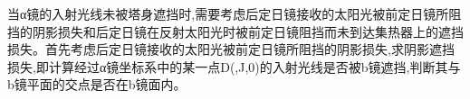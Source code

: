 当α镜的入射光线未被塔身遮挡时,需要考虑后定日镜接收的太阳光被前定日镜所阻挡的阴影损失和后定日镜在反射太阳光时被前定日镜阻挡而未到达集热器上的遮挡损失。首先考虑后定日镜接收的太阳光被前定日镜所阻挡的阴影损失,求阴影遮挡损失,即计算经过α镜坐标系中的某一点D(,J,0)的入射光线是否被b镜遮挡,判断其与b镜平面的交点是否在b镜面内。
